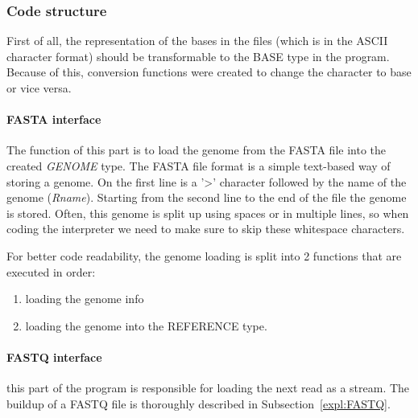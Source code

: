 \subsubsection{Code structure}
\label{codeStructure}

First of all, the representation of the bases in the files (which is in the ASCII character format) should be transformable to the BASE type in the program. Because of this, conversion functions were created to change the character to base or vice versa.

\paragraph{FASTA interface} The function of this part is to load the genome from the FASTA file into the created \emph{GENOME} type. 
The FASTA file format is a simple text-based way of storing a genome. On the first line is a '>' character followed by the name of the genome (\emph{Rname}). Starting from the second line to the end of the file the genome is stored. Often, this genome is split up using spaces or in multiple lines, so when coding the interpreter we need to make sure to skip these whitespace characters.

For better code readability, the genome loading is split into 2 functions that are executed in order:
\begin{enumerate}
	\item loading the genome info
	\item loading the genome into the REFERENCE type. 
\end{enumerate}

\paragraph{FASTQ interface} this part of the program is responsible for loading the next read as a stream. The buildup of a FASTQ file is thoroughly described in Subsection~\ref{expl:FASTQ}.

